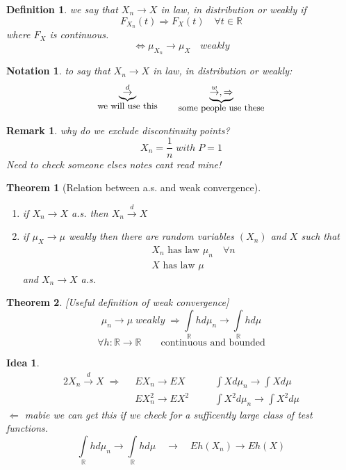 \documentclass[12pt]{article}
\def\RR{\mathbb{R}}
\newtheorem{theorem}{Theorem}[section]
\newtheorem{definition}{Definition}[section]
\newtheorem*{remark}{Remark}
\newtheorem*{idea}{Idea}
\newtheorem*{notation}{Notation}
\begin{document}
\begin{definition}
we say that $X_n \rightarrow X$ in law, in distribution or weakly if 
\[F_{X_n}(t) \Rightarrow F_X(t) \quad \forall t \in \RR\]
where $F_X$ is continuous. 
\[\Leftrightarrow \mu_{X_n} \rightarrow \mu_X \quad weakly\]
\end{definition} 

\begin{notation} to say that $X_n \rightarrow X$ in law, in distribution or weakly:
 \[\underbrace{\overset{d}{\rightarrow}}_{\text{\small we will use this}} \qquad \underbrace{\overset{w}{\rightarrow}, \Rightarrow}_{\text{\small some people use these}}\]
\end{notation}

\begin{remark}
why do we exclude discontinuity points?
\[X_n = \frac{1}{n} \; with \; P=1\]
Need to check someone elses notes cant read mine!
\end{remark}

\begin{theorem}[Relation between a.s. and weak convergence]\label{weak1}\quad \\
\begin{enumerate}
\item if $X_n\rightarrow X$ a.s. then $X_n\overset{d}{\rightarrow} X$
\item if $\mu_X \rightarrow \mu$ weakly then there are random variables $(X_n)$ and $X$ such that
\begin{align*} &X_n\text{ has law }\mu_n \quad \forall n\\ &X\text{ has law }\mu \end{align*}
and $X_n \rightarrow X$ a.s.
\end{enumerate}
\end{theorem}
\begin{theorem}\label{weak2}[Useful definition of weak convergence]
\[\mu_n \rightarrow \mu \;weakly \; \Rightarrow \int\limits_{\RR}hd\mu_n \rightarrow \int\limits_{\RR}hd\mu \]
\[\forall h:\RR \rightarrow \RR \qquad \text{continuous and bounded}\]
\end{theorem}

\begin{idea}
\begin{alignat*}{2}
X_n \overset{d}{\rightarrow} X \; \Rightarrow \; \; &EX_n \rightarrow EX & \quad &\int Xd\mu_n \rightarrow \int Xd\mu \\
&EX_n^2 \rightarrow EX^2 & \quad &\int X^2 d\mu_n \rightarrow \int X^2 d\mu \end{alignat*}
$\Leftarrow$ mabie we can get this if we check for a sufficently large class of test functions.
\[\boxed{\int\limits_{\RR}hd\mu_n \rightarrow \int\limits_{\RR}hd\mu} \quad \rightarrow \quad  Eh(X_n) \rightarrow Eh(X)\]
\end{idea}
\end{document}
